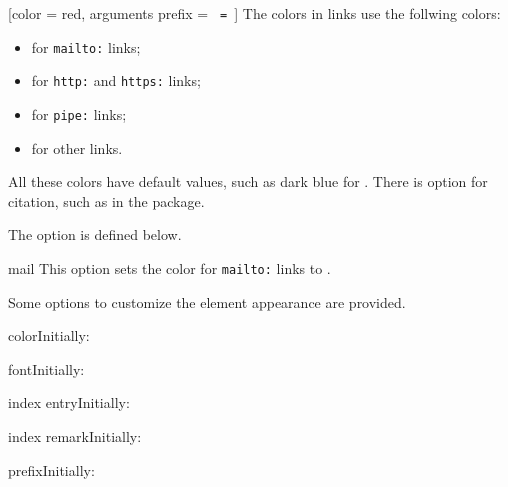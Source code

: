 \documentclass[11pt, outputdir = ./out]{article}
\begin{document}
\begin{example}{}
    [color = red, arguments prefix = \texttt{~=~}]
    The colors in links use the follwing colors:
    \begin{itemize}
        \item {} for \texttt{mailto:} links;
        \item {} for \texttt{http:} and \texttt{https:} links;
        \item {} for \texttt{pipe:} links;
        \item {} for other links.
    \end{itemize}

    All these colors have default values, such as dark blue for . There is option for citation, such as  in the  package.

    The  option is defined below.

    \begin{LinkColorsdef}{mail}{}{}
        This option sets the color for \texttt{mailto:} links to .
    \end{LinkColorsdef}
\end{example}



Some options to customize the element appearance are provided.


\begin{Optiondef}{color}{}{Initially: }
\end{Optiondef}

\begin{Optiondef}{font}{}{Initially: }
\end{Optiondef}

\begin{Optiondef}{index entry}{}{Initially: }
\end{Optiondef}

\begin{Optiondef}{index remark}{}{Initially: }
\end{Optiondef}

\begin{Optiondef}{prefix}{}{Initially: \Empty}
\end{Optiondef}
\end{document}
